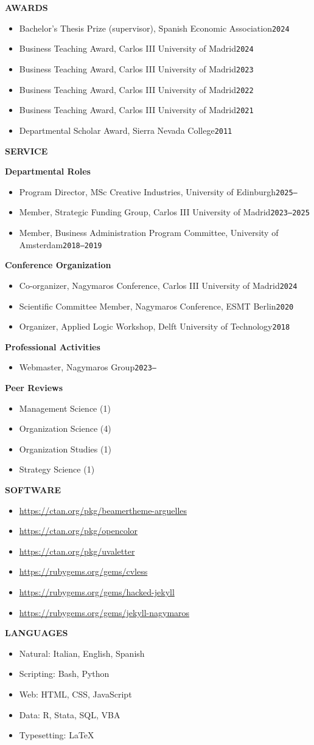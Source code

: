 \documentclass[a4paper]{article}
\newenvironment{cvlines}{\begin{itemize}[nosep,leftmargin=1em]}{\end{itemize}}
\newcommand\cvsection[1]{\textbf{\uppercase{#1}}\hspace{.5em}\hrulefill\par}
\newcommand\cvsubsection[1]{\textbf{#1}\par}
\newcommand\cvline[4][,]{\item[\textperiodcentered] {#2#1 #3\hfill{\texttt{#4}}}}
\begin{document}
\bigskip
\cvsection{Awards}
\smallskip
\begin{cvlines}
  \cvline{Bachelor's Thesis Prize (supervisor)}{Spanish Economic Association}{2024}
  \cvline{Business Teaching Award}{Carlos III University of Madrid}{2024}
  \cvline{Business Teaching Award}{Carlos III University of Madrid}{2023}
  \cvline{Business Teaching Award}{Carlos III University of Madrid}{2022}
  \cvline{Business Teaching Award}{Carlos III University of Madrid}{2021}
  \cvline{Departmental Scholar Award}{Sierra Nevada College}{2011}
\end{cvlines}
\bigskip
\cvsection{Service}
\smallskip
\cvsubsection{Departmental Roles}
\smallskip
\begin{cvlines}
  \cvline{Program Director, MSc Creative Industries}{University of Edinburgh}{2025--\phantom{0000}}
  \cvline{Member, Strategic Funding Group}{Carlos III University of Madrid}{2023--2025}
  \cvline{Member, Business Administration Program Committee}{University of Amsterdam}{2018--2019}
\end{cvlines}
\medskip
\cvsubsection{Conference Organization}
\smallskip
\begin{cvlines}
  \cvline{Co-organizer, Nagymaros Conference}{Carlos III University of Madrid}{2024}
  \cvline{Scientific Committee Member, Nagymaros Conference}{ESMT Berlin}{2020}
  \cvline{Organizer, Applied Logic Workshop}{Delft University of Technology}{2018}
\end{cvlines}
\medskip
\cvsubsection{Professional Activities}
\smallskip
\begin{cvlines}
  \cvline{Webmaster}{Nagymaros Group}{2023--\phantom{0000}}
\end{cvlines}
\medskip
\cvsubsection{Peer Reviews}
\smallskip
\begin{cvlines}
  \cvline[]{Management Science}{(1)}{}
  \cvline[]{Organization Science}{(4)}{}
  \cvline[]{Organization Studies}{(1)}{}
  \cvline[]{Strategy Science}{(1)}{}
\end{cvlines}
\bigskip
\cvsection{Software}
\smallskip
\begin{cvlines}
  \cvline[]{\url{https://ctan.org/pkg/beamertheme-arguelles}}{}{}
  \cvline[]{\url{https://ctan.org/pkg/opencolor}}{}{}
  \cvline[]{\url{https://ctan.org/pkg/uvaletter}}{}{}
  \cvline[]{\url{https://rubygems.org/gems/cvless}}{}{}
  \cvline[]{\url{https://rubygems.org/gems/hacked-jekyll}}{}{}
  \cvline[]{\url{https://rubygems.org/gems/jekyll-nagymaros}}{}{}
\end{cvlines}
\bigskip
\cvsection{Languages}
\smallskip
\begin{cvlines}
  \cvline[:]{Natural}{Italian, English, Spanish}{}
  \cvline[:]{Scripting}{Bash, Python}{}
  \cvline[:]{Web}{HTML, CSS, JavaScript}{}
  \cvline[:]{Data}{R, Stata, SQL, VBA}{}
  \cvline[:]{Typesetting}{LaTeX}{}
\end{cvlines}
\end{document}
